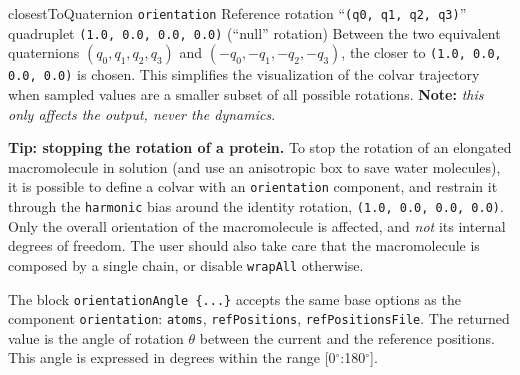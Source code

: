 \begin{cvcoptions}
\item %
\item %
\item %


\item %
  \keydef
    {closestToQuaternion}{%
    \texttt{orientation}}{%
    Reference rotation}{%
    ``\texttt{(q0, q1, q2, q3)}'' quadruplet}{%
    \texttt{(1.0, 0.0, 0.0, 0.0)} (``null'' rotation)}{%
    Between the two equivalent quaternions $(q_0, q_1, q_2, q_3)$ and
    $(-q_0, -q_1, -q_2, -q_3)$, the closer to \texttt{(1.0, 0.0, 0.0,
      0.0)} is chosen.  This simplifies the visualization of the
    colvar trajectory when sampled values are a smaller subset of all
    possible rotations.  \textbf{Note:} \emph {this only affects the
      output, never the dynamics}.}

\end{cvcoptions}

\textbf{Tip: stopping the rotation of a protein.}  To stop the
rotation of an elongated macromolecule in solution (and use an
anisotropic box to save water molecules), it is possible to define a
colvar with an \texttt{orientation} component, and restrain it through
the \texttt{harmonic} bias around the identity rotation, \texttt{(1.0,
  0.0, 0.0, 0.0)}.  Only the overall orientation of the macromolecule
is affected, and \emph{not} its internal degrees of freedom.  The user
should also take care that the macromolecule is composed by a single
chain, or disable \texttt{wrapAll} otherwise.




The block \texttt{orientationAngle~\{...\}} accepts the same base options as
the component \texttt{orientation}: \texttt{atoms}, \texttt{refPositions}, \texttt{refPositionsFile}.
The returned value is the angle of rotation $\theta$ between the current and the reference positions.
This angle is expressed in degrees within the range [0$^{\circ}$:180$^{\circ}$].

